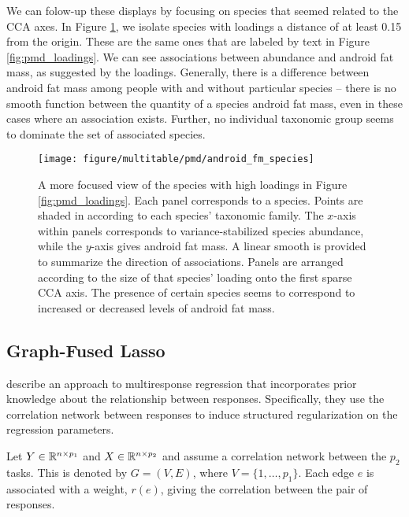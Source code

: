 \documentclass[utf8]{frontiersFPHY} %
\begin{document}
We can folow-up these displays by focusing on species that seemed related to the
CCA axes. In Figure \ref{fig:pmd_android_fm_species}, we isolate species with
loadings a distance of at least 0.15 from the origin. These are the same ones
that are labeled by text in Figure \ref{fig:pmd_loadings}. We can see
associations between abundance and android fat mass, as suggested by the
loadings. Generally, there is a difference between android fat mass among people
with and without particular species -- there is no smooth function between the
quantity of a species android fat mass, even in these cases where an association
exists. Further, no individual taxonomic group seems to dominate the set of
associated species.

\begin{figure}
  \centering
  \texttt{[image: figure/multitable/pmd/android\_fm\_species]}
  \caption{ A more focused view of the species with high loadings in Figure
    \ref{fig:pmd_loadings}. Each panel corresponds to a species. Points are
    shaded in according to each species' taxonomic family. The $x$-axis within
    panels corresponds to variance-stabilized species abundance, while the
    $y$-axis gives android fat mass. A linear smooth is provided to summarize
    the direction of associations. Panels are arranged according to the size of
    that species' loading onto the first sparse CCA axis. The presence of
    certain species seems to correspond to increased or decreased levels of
    android fat mass.
    \label{fig:pmd_android_fm_species}
  }
\end{figure}

\subsection{Graph-Fused Lasso}
\label{subsec:graph_fused_lasso}

\cite{chen2010graph} describe an approach to multiresponse regression that
incorporates prior knowledge about the relationship between responses.
Specifically, they use the correlation network between responses to induce
structured regularization on the regression parameters.

Let $Y \in \mathbb{R}^{n \times p_{1}}$ and $X \in \mathbb{R}^{n \times p_{2}}$ and
assume a correlation network between the $p_{2}$ tasks. This is denoted by $G =
\left(V, E\right)$, where $V = \{1, \dots, p_{1}\}$. Each edge $e$ is associated
with a weight, $r\left(e\right)$, giving the correlation between the pair of
responses.
\end{document}
